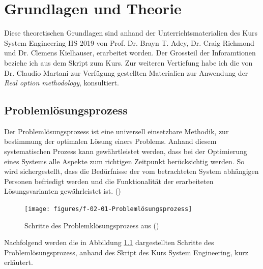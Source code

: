 %
%            
%
%
%

\chapter{Grundlagen und Theorie}
\label{chap:Grundlage}

Diese theoretischen Grundlagen sind anhand der Unterrichtsmaterialien des Kurs System Engineering HS 2019 von Prof. Dr. Brayn T. Adey, Dr. Craig Richmond und Dr. Clemens Kielhauser, erarbeitet worden. Der Grossteil der Inforamtionen beziehe ich aus dem Skript zum Kurs. Zur weiteren Vertiefung habe ich die von Dr. Claudio Martani zur Verfügung gestellten Materialien zur Anwendung der \textit{Real option methodology}, konsultiert.  

\section{Problemlösungsprozess}
\label{sec:Problemprozess}

Der Problemlösungsprozess ist eine universell einsetzbare Methodik, zur bestimmung der optimalen Lösung einers Problems. Anhand diesem systematischen Prozess kann gewährtleistet werden, dass bei der Optimierung eines Systems alle Aspekte zum richtigen Zeitpunkt berücksichtig werden. So wird sichergestellt, dass die Bedürfnisse der vom betrachteten System abhängigen Personen befriedigt werden und die Funktionalität der erarbeiteten Lösungsvarianten gewährleistet ist. (\cite{Adey2019}) 

\begin{figure}[h!]
	\centering
	\texttt{[image: figures/f-02-01-Problemlösungsprozess]}
	\caption[Schritte des Problemklösungsprozess]{Schritte des Problemklösungsprozess aus (\cite{Adey2019})}
	\label{img:Problemlösung}
\end{figure}

Nachfolgend werden die in Abbildung \ref{img:Problemlösung} dargestellten Schritte des Problemlösungsprozess, anhand des Skript des Kurs System Engineering, kurz erläutert. 

